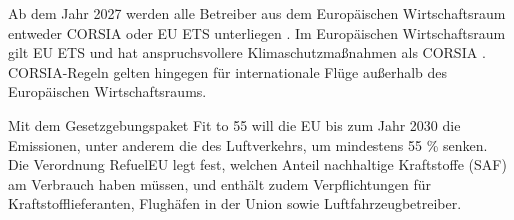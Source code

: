 Ab dem Jahr 2027 werden alle Betreiber aus dem Europäischen Wirtschaftsraum 
entweder CORSIA oder EU ETS unterliegen \cite{uba_aviation_2023}.
Im Europäischen Wirtschaftsraum gilt EU ETS und hat anspruchsvollere 
Klimaschutzmaßnahmen als CORSIA \cite{uba_aviation_2023}.
CORSIA-Regeln gelten hingegen für internationale Flüge außerhalb des Europäischen Wirtschaftsraums.

Mit dem Gesetzgebungspaket \glqq Fit to 55 \grqq{} will die EU bis zum Jahr 2030 die Emissionen, 
unter anderem die des Luftverkehrs, um mindestens 55 \% senken.
Die Verordnung RefuelEU legt fest, welchen Anteil nachhaltige Kraftstoffe (SAF) am Verbrauch haben müssen, 
und enthält zudem Verpflichtungen für Kraftstofflieferanten, Flughäfen in der Union sowie Luftfahrzeugbetreiber.

